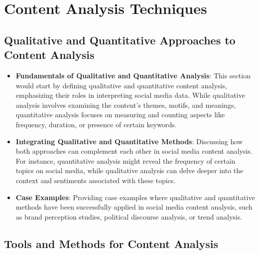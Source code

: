 \documentclass[
]{book}
\providecommand{\tightlist}{%
  \setlength{\itemsep}{0pt}\setlength{\parskip}{0pt}}
\begin{document}
\hypertarget{content-analysis-techniques}{%
\chapter{Content Analysis Techniques}\label{content-analysis-techniques}}

\hypertarget{qualitative-and-quantitative-approaches-to-content-analysis}{%
\section*{Qualitative and Quantitative Approaches to Content Analysis}\label{qualitative-and-quantitative-approaches-to-content-analysis}}

\begin{itemize}
\tightlist
\item
  \textbf{Fundamentals of Qualitative and Quantitative Analysis}: This section would start by defining qualitative and quantitative content analysis, emphasizing their roles in interpreting social media data. While qualitative analysis involves examining the content's themes, motifs, and meanings, quantitative analysis focuses on measuring and counting aspects like frequency, duration, or presence of certain keywords.
\item
  \textbf{Integrating Qualitative and Quantitative Methods}: Discussing how both approaches can complement each other in social media content analysis. For instance, quantitative analysis might reveal the frequency of certain topics on social media, while qualitative analysis can delve deeper into the context and sentiments associated with these topics.
\item
  \textbf{Case Examples}: Providing case examples where qualitative and quantitative methods have been successfully applied in social media content analysis, such as brand perception studies, political discourse analysis, or trend analysis.
\end{itemize}

\hypertarget{tools-and-methods-for-content-analysis}{%
\section*{Tools and Methods for Content Analysis}\label{tools-and-methods-for-content-analysis}}
\end{document}
